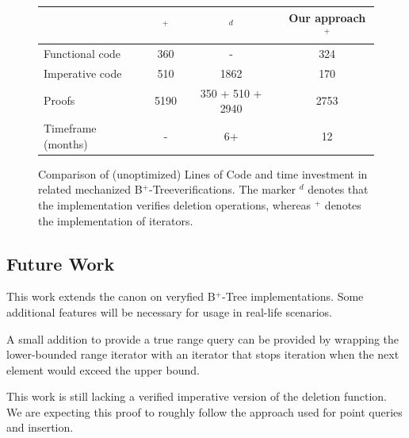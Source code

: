 \documentclass[a4paper,UKenglish,cleveref, autoref, thm-restate]{lipics-v2021}
\newcommand{\btree}{B$^+$-Tree}
\begin{document}
\begin{figure}
    \centering
    \begin{tabular}{l|c|c|c}
        \                & \cite{DBLP:conf/popl/MalechaMSW10}$^{+}$ & \cite{DBLP:journals/sosym/ErnstSR15}$^{d}$ & Our approach$^{+}$ \\
        \hline
        Functional code &   360      & -                    & 324  \\ %
        Imperative code &   510      & 1862                  & 170  \\
        Proofs          &  5190      & 350 + 510 + 2940\footnotemark[7] & 2753 \\
        Timeframe (months) &  -     & 6+                      & 12   \\
    \end{tabular}
    \caption[Comparison of (unoptimized) Lines of Code and time investment in related mechanized \btree verifications.]
    {Comparison of (unoptimized) Lines of Code and time investment in related mechanized \btree verifications.
    The marker $^d$ denotes that the implementation verifies deletion operations, whereas $^+$ denotes the implementation of iterators.
    }
    \label{fig:proof-comparison}
\end{figure}

\subsection{Future Work}

This work extends the canon on veryfied \btree
implementations.
Some additional features will be necessary for
usage in real-life scenarios.

A small addition to provide a true
range query can be provided by wrapping the lower-bounded
range iterator with an iterator
that stops iteration when the next element
would exceed the upper bound.

This work is still lacking a verified imperative version
of the deletion function.
We are expecting this proof to roughly follow
the approach used for point queries and insertion.
\end{document}

